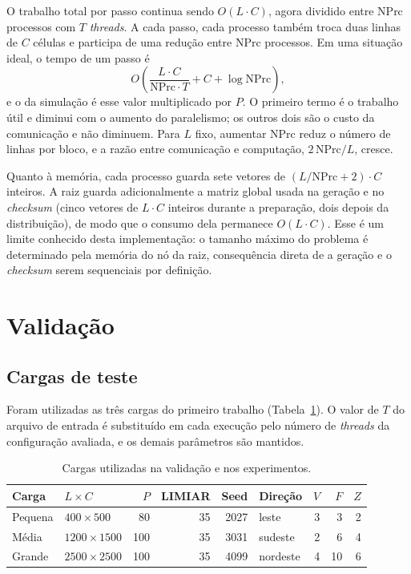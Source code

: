 \documentclass[11pt,a4paper]{article}
\begin{document}
O trabalho total por passo continua sendo $O(L \cdot C)$, agora dividido entre NPrc processos com $T$ \emph{threads}. A cada passo, cada processo também troca duas linhas de $C$ células e participa de uma redução entre NPrc processos. Em uma situação ideal, o tempo de um passo é
$$
O\left(\frac{L \cdot C}{\text{NPrc} \cdot T} + C + \log \text{NPrc}\right),
$$
e o da simulação é esse valor multiplicado por $P$. O primeiro termo é o trabalho útil e diminui com o aumento do paralelismo; os outros dois são o custo da comunicação e não diminuem. Para $L$ fixo, aumentar NPrc reduz o número de linhas por bloco, e a razão entre comunicação e computação, $2\,\text{NPrc}/L$, cresce.

Quanto à memória, cada processo guarda sete vetores de $(L/\text{NPrc} + 2) \cdot C$ inteiros. A raiz guarda adicionalmente a matriz global usada na geração e no \emph{checksum} (cinco vetores de $L \cdot C$ inteiros durante a preparação, dois depois da distribuição), de modo que o consumo dela permanece $O(L \cdot C)$. Esse é um limite conhecido desta implementação: o tamanho máximo do problema é determinado pela memória do nó da raiz, consequência direta de a geração e o \emph{checksum} serem sequenciais por definição.

\section{Validação}
\label{sec:validacao}

\subsection{Cargas de teste}

Foram utilizadas as três cargas do primeiro trabalho (Tabela~\ref{tab:entradas}). O valor de $T$ do arquivo de entrada é substituído em cada execução pelo número de \emph{threads} da configuração avaliada, e os demais parâmetros são mantidos.

\begin{table}[H]
\centering
\small
\begin{tabular}{@{}llrrrlrrr@{}}
\toprule
Carga & $L \times C$ & $P$ & LIMIAR & Seed & Direção & $V$ & $F$ & $Z$ \\
\midrule
Pequena & $400 \times 500$   & 80  & 35 & 2027 & leste    & 3 & 3  & 2 \\
Média   & $1200 \times 1500$ & 100 & 35 & 3031 & sudeste  & 2 & 6  & 4 \\
Grande  & $2500 \times 2500$ & 100 & 35 & 4099 & nordeste & 4 & 10 & 6 \\
\bottomrule
\end{tabular}
\caption{Cargas utilizadas na validação e nos experimentos.}
\label{tab:entradas}
\end{table}
\end{document}
